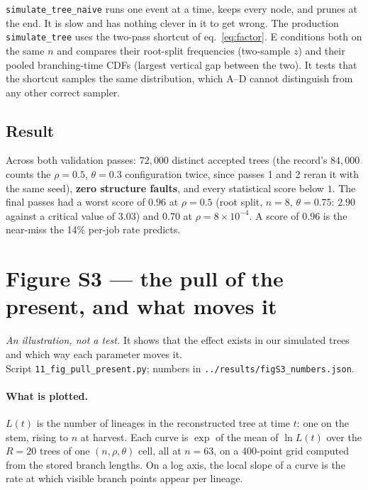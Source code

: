 \documentclass[11pt]{article}
\newcommand{\turn}{\theta}       %
\newcommand{\capt}{\rho}         %
\begin{document}
\texttt{simulate\_tree\_naive} runs one event at a time, keeps every node, and prunes at the end. It
is slow and has nothing clever in it to get wrong. The production \texttt{simulate\_tree} uses the
two-pass shortcut of eq.~\eqref{eq:factor}. E conditions both on the same $n$ and compares their
root-split frequencies (two-sample $z$) and their pooled branching-time CDFs (largest vertical gap
between the two). It tests that the shortcut samples the same distribution, which A--D cannot
distinguish from any other correct sampler.

\subsection{Result}

Across both validation passes: $72{,}000$ distinct accepted trees (the record's $84{,}000$ counts
the $\capt=0.5$, $\turn=0.3$ configuration twice, since passes 1 and 2 reran it with the same seed),
\textbf{zero structure faults}, and every statistical score below $1$. The final passes had a worst score of $0.96$ at $\capt=0.5$ (root
split, $n=8$, $\turn=0.75$: $2.90$ against a critical value of $3.03$) and $0.70$ at
$\capt=8\times10^{-4}$. A score of $0.96$ is the near-miss the 14\% per-job rate predicts.


\section{Figure S3 --- the pull of the present, and what moves it}\label{sec:S3}

\emph{An illustration, not a test.} It shows that the effect exists in our simulated trees and
which way each parameter moves it.\\
Script \texttt{11\_fig\_pull\_present.py}; numbers in
\texttt{../results/figS3\_numbers.json}.

\paragraph{What is plotted.} $L(t)$ is the number of lineages in the reconstructed tree at time
$t$: one on the stem, rising to $n$ at harvest. Each curve is $\exp$ of the mean of $\ln L(t)$ over
the $R=20$ trees of one $(n,\capt,\turn)$ cell, all at $n=63$, on a 400-point grid computed from
the stored branch lengths. On a log axis, the local slope of a curve is the rate at which visible
branch points appear per lineage.
\end{document}
